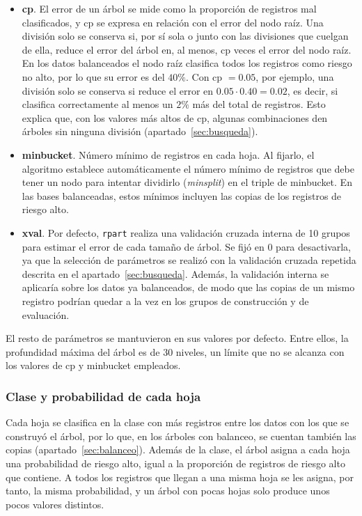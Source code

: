 \documentclass[twoside,a4paper,12pt,onecolumn,openany]{book}
\begin{document}
\begin{itemize}
    \item \textbf{cp}. El error de un árbol se mide como la proporción de registros mal clasificados, y cp se expresa en relación con el error del nodo raíz. Una división solo se conserva si, por sí sola o junto con las divisiones que cuelgan de ella, reduce el error del árbol en, al menos, cp veces el error del nodo raíz. En los datos balanceados el nodo raíz clasifica todos los registros como riesgo no alto, por lo que su error es del $40\%$. Con cp $=0.05$, por ejemplo, una división solo se conserva si reduce el error en $0.05 \cdot 0.40 = 0.02$, es decir, si clasifica correctamente al menos un $2\%$ más del total de registros. Esto explica que, con los valores más altos de cp, algunas combinaciones den árboles sin ninguna división (apartado~\ref{sec:busqueda}).
    \item \textbf{minbucket}. Número mínimo de registros en cada hoja. Al fijarlo, el algoritmo establece automáticamente el número mínimo de registros que debe tener un nodo para intentar dividirlo (\textit{minsplit}) en el triple de minbucket. En las bases balanceadas, estos mínimos incluyen las copias de los registros de riesgo alto.
    \item \textbf{xval}. Por defecto, \texttt{rpart} realiza una validación cruzada interna de 10 grupos para estimar el error de cada tamaño de árbol. Se fijó en $0$ para desactivarla, ya que la selección de parámetros se realizó con la validación cruzada repetida descrita en el apartado~\ref{sec:busqueda}. Además, la validación interna se aplicaría sobre los datos ya balanceados, de modo que las copias de un mismo registro podrían quedar a la vez en los grupos de construcción y de evaluación.
\end{itemize}
 
El resto de parámetros se mantuvieron en sus valores por defecto. Entre ellos, la profundidad máxima del árbol es de 30 niveles, un límite que no se alcanza con los valores de cp y minbucket empleados.
 
\subsubsection*{Clase y probabilidad de cada hoja}
 
Cada hoja se clasifica en la clase con más registros entre los datos con los que se construyó el árbol, por lo que, en los árboles con balanceo, se cuentan también las copias (apartado~\ref{sec:balanceo}). Además de la clase, el árbol asigna a cada hoja una probabilidad de riesgo alto, igual a la proporción de registros de riesgo alto que contiene. A todos los registros que llegan a una misma hoja se les asigna, por tanto, la misma probabilidad, y un árbol con pocas hojas solo produce unos pocos valores distintos.
 
\end{document}
